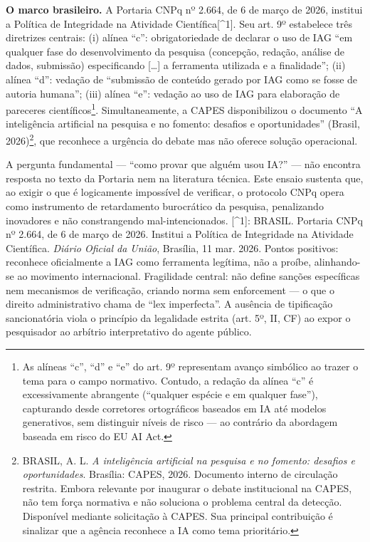 \documentclass[
  12pt,
  a4paper,
  brazil
]{article}
\begin{document}
\textbf{O marco brasileiro.} A Portaria CNPq nº 2.664, de 6 de março de
2026, institui a Política de Integridade na Atividade
Científica{[}\^{}1{]}. Seu art. 9º estabelece três diretrizes centrais:
(i) alínea ``c'': obrigatoriedade de declarar o uso de IAG ``em qualquer
fase do desenvolvimento da pesquisa (concepção, redação, análise de
dados, submissão) especificando {[}\ldots{]} a ferramenta utilizada e a
finalidade''; (ii) alínea ``d'': vedação de ``submissão de conteúdo
gerado por IAG como se fosse de autoria humana''; (iii) alínea ``e'':
vedação ao uso de IAG para elaboração de pareceres
científicos\footnote{As alíneas ``c'', ``d'' e ``e'' do art. 9º
  representam avanço simbólico ao trazer o tema para o campo normativo.
  Contudo, a redação da alínea ``c'' é excessivamente abrangente
  (``qualquer espécie e em qualquer fase''), capturando desde corretores
  ortográficos baseados em IA até modelos generativos, sem distinguir
  níveis de risco --- ao contrário da abordagem baseada em risco do EU
  AI Act.}. Simultaneamente, a CAPES disponibilizou o documento ``A
inteligência artificial na pesquisa e no fomento: desafios e
oportunidades'' (Brasil, 2026)\footnote{BRASIL, A. L. \emph{A
  inteligência artificial na pesquisa e no fomento: desafios e
  oportunidades}. Brasília: CAPES, 2026. Documento interno de circulação
  restrita. Embora relevante por inaugurar o debate institucional na
  CAPES, não tem força normativa e não soluciona o problema central da
  detecção. Disponível mediante solicitação à CAPES. Sua principal
  contribuição é sinalizar que a agência reconhece a IA como tema
  prioritário.}, que reconhece a urgência do debate mas não oferece
solução operacional.

A pergunta fundamental --- ``como provar que alguém usou IA?'' --- não
encontra resposta no texto da Portaria nem na literatura técnica. Este
ensaio sustenta que, ao exigir o que é logicamente impossível de
verificar, o protocolo CNPq opera como instrumento de retardamento
burocrático da pesquisa, penalizando inovadores e não constrangendo
mal-intencionados. {[}\^{}1{]}: BRASIL. Portaria CNPq nº 2.664, de 6 de
março de 2026. Institui a Política de Integridade na Atividade
Científica. \emph{Diário Oficial da União}, Brasília, 11 mar. 2026.
Pontos positivos: reconhece oficialmente a IAG como ferramenta legítima,
não a proíbe, alinhando-se ao movimento internacional. Fragilidade
central: não define sanções específicas nem mecanismos de verificação,
criando norma sem enforcement --- o que o direito administrativo chama
de ``lex imperfecta''. A ausência de tipificação sancionatória viola o
princípio da legalidade estrita (art. 5º, II, CF) ao expor o pesquisador
ao arbítrio interpretativo do agente público.
\end{document}
